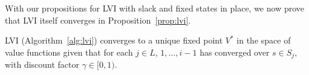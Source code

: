 
With our propositions for LVI with slack and fixed states in place, we now prove that LVI itself converges in Proposition~\ref{prop:lvi}.

\begin{proposition}
    \label{prop:lvi}
    LVI (Algorithm~\ref{alg:lvi}) converges to a unique fixed point $V^*$ in the space of value functions given that for each $j \in L$, $1, \ldots, i - 1$ has converged over $s \in S_j$, with discount factor $\gamma \in [0, 1)$.
\end{proposition}






